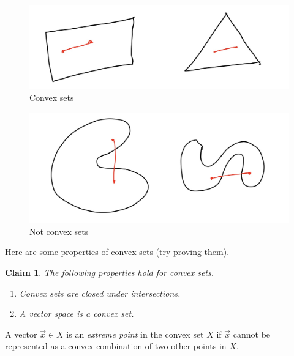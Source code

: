 \documentclass[12pt,
    driverfallback=dvipdfm,
 	openany,
    a4paper,
    toc=bibliography,
    twoside,
    numbers=noenddot]{book}              %
\newtheorem{claim}[theorem]{Claim}
\begin{document}
\begin{figure}
\includegraphics[scale=0.2]{convex.PNG}
\caption{Convex sets}
\label{fig:convex}
\end{figure}

\begin{figure}
\includegraphics[scale=0.2]{notConvex.PNG}
\caption{Not convex sets}
\label{fig:notconvex}
\end{figure}

Here are some properties of convex sets (try proving them).
\begin{claim}
The following properties hold for convex sets.
\begin{enumerate}
\item Convex sets are closed under intersections.
\item A vector space is a convex set.
\end{enumerate}
\end{claim}

A vector $\vec x \in X$ is an \emph{extreme point} in the convex set $X$ if $\vec x$ cannot be represented as a convex combination of two other points in $X$.
\end{document}
